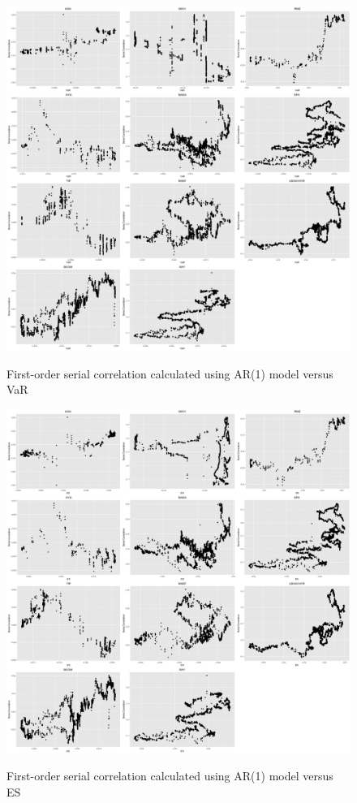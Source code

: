 \documentclass[12pt]{article}
\begin{document}
\begin{figure}
  \caption{First-order serial correlation calculated using AR(1) model versus VaR}
  \includegraphics[width = 1\textwidth]{../results/SerCol-VaR5yrAR1}
  \label{fig:SerCol-VaR5yrAR1}
\end{figure}

\begin{figure}
  \caption{First-order serial correlation calculated using AR(1) model versus ES}
  \includegraphics[width = 1\textwidth]{../results/SerCol-ES5yrAR1}
  \label{fig:SerCol-ES5yrAR1}
\end{figure}
\end{document}
